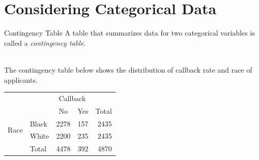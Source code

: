 \documentclass[notes,11pt, aspectratio=169]{beamer}
\newcommand{\hl}[1]{\textit{\textcolor{hlblue}{#1}}}
\begin{document}

\section{Considering Categorical Data}


\begin{frame}{Contingency Table}
A table that summarizes data for two categorical variables is called a \hl{contingency table}.

$\:$ \\
\pause
The contingency table below shows the distribution of callback rate and race of applicants.

\begin{center}
\begin{tabular}{l l cc r}
					               & 			 & \multicolumn{2}{c}{{Callback}} \\
  \cline{3-4}
					               &			 & No	 & Yes	& Total \\ 
  \cline{2-5}
\multirow{2}{*}{{Race}}& Black & 2278  & 157	  	& 2435 \\ 
  					             & White & 2200	 & 235 	    & 2435 \\ 
  \cline{2-5}
  					             & Total & 4478  & 392	    &  4870 \\
  \cline{2-5}
\end{tabular}
\end{center}
\end{frame}


\end{document}
